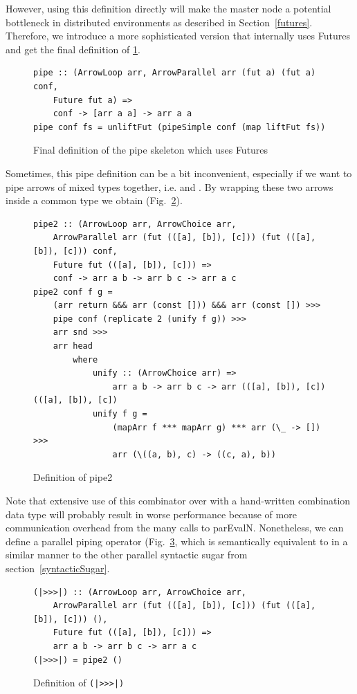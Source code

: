 However, using this definition directly will make the master node a potential bottleneck in distributed environments as described in Section~\ref{futures}. Therefore, we introduce a more sophisticated version that internally uses Futures and get the final definition of  \ref{fig:pipe}.
\begin{figure}[h]
\begin{lstlisting}[frame=htrbl]
pipe :: (ArrowLoop arr, ArrowParallel arr (fut a) (fut a) conf,
	Future fut a) =>
	conf -> [arr a a] -> arr a a
pipe conf fs = unliftFut (pipeSimple conf (map liftFut fs))
\end{lstlisting}
\caption{Final definition of the pipe skeleton which uses Futures}
\label{fig:pipe}
\end{figure}

Sometimes, this pipe definition can be a bit inconvenient, especially if we want to pipe arrows of mixed types together, i.e.  and . By wrapping these two arrows inside a common type we obtain  (Fig.~\ref{fig:pipe2}).
\begin{figure}[h]
\begin{lstlisting}[frame=htrbl]
pipe2 :: (ArrowLoop arr, ArrowChoice arr,
	ArrowParallel arr (fut (([a], [b]), [c])) (fut (([a], [b]), [c])) conf,
	Future fut (([a], [b]), [c])) =>
	conf -> arr a b -> arr b c -> arr a c
pipe2 conf f g = 
	(arr return &&& arr (const [])) &&& arr (const []) >>>
	pipe conf (replicate 2 (unify f g)) >>>
	arr snd >>>
	arr head
		where
			unify :: (ArrowChoice arr) =>
				arr a b -> arr b c -> arr (([a], [b]), [c]) (([a], [b]), [c])
			unify f g =
				(mapArr f *** mapArr g) *** arr (\_ -> []) >>>
				arr (\((a, b), c) -> ((c, a), b))
\end{lstlisting}
\caption{Definition of pipe2}
\label{fig:pipe2}
\end{figure}

Note that extensive use of this combinator over  with a hand-written combination data type will probably result in worse performance because of more communication overhead from the many calls to parEvalN. Nonetheless, we can define a parallel piping operator \inlinecode{(|>>>|)} (Fig.~\ref{fig:par>>>}, which is semantically equivalent to \inlinecode{(>>>)} in a similar manner to the other parallel syntactic sugar from section~\ref{syntacticSugar}.
\begin{figure}[h]
\begin{lstlisting}[frame=htrbl]
(|>>>|) :: (ArrowLoop arr, ArrowChoice arr,
	ArrowParallel arr (fut (([a], [b]), [c])) (fut (([a], [b]), [c])) (),
	Future fut (([a], [b]), [c])) =>
	arr a b -> arr b c -> arr a c
(|>>>|) = pipe2 ()
\end{lstlisting}
\caption{Definition of \texttt{(|>>>|)}}
\label{fig:par>>>}
\end{figure}

